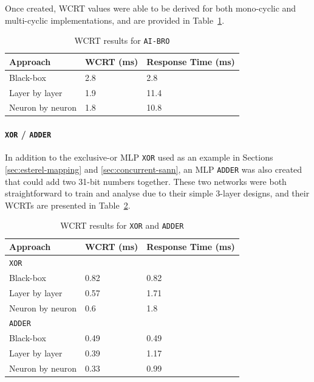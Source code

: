 

Once created, \ac{WCRT} values were able to be derived for both mono-cyclic and multi-cyclic implementations, and are provided in Table~\ref{tbl:res-aibro}.

\begin{table}[H]
	\centering
	\caption{\ac{WCRT} results for \texttt{AI-BRO}}
	\label{tbl:res-aibro}
	\begin{tabular}{|l|l|l|}
		\hline
		Approach         & WCRT (ms) & Response Time (ms)\\ \hline
		Black-box        & 2.8  & 2.8  \\ 
		Layer by layer   & 1.9  & 11.4 \\ 
		Neuron by neuron & 1.8  & 10.8 \\ \hline
	\end{tabular}
\end{table}


\paragraph{\texttt{XOR} / \texttt{ADDER}}
\label{sec:xor-and-adder}

In addition to the exclusive-or \ac{MLP} \texttt{XOR} used as an example in Sections
\ref{sec:esterel-mapping} and \ref{sec:concurrent-sann},
an \ac{MLP} \texttt{ADDER} was also created that could add two 31-bit numbers together. 
These two networks were both straightforward to train and analyse 
due to their simple 3-layer designs, and their \acp{WCRT} are presented in Table~\ref{tbl:res-xor-adder}.

\begin{table}[H]
	\centering
	\caption{\ac{WCRT} results for \texttt{XOR} and \texttt{ADDER}}
	\label{tbl:res-xor-adder}
	\begin{tabular}{|l|l|l|}
		\hline
		Approach         & WCRT (ms) & Response Time (ms)\\ \hline
		\multicolumn{3}{|l|}{\texttt{XOR}}  \\ \hline
		Black-box        & 0.82 & 0.82   \\ 
		Layer by layer   & 0.57 & 1.71  \\ 
		Neuron by neuron & 0.6  & 1.8 \\  \hline
		\multicolumn{3}{|l|}{\texttt{ADDER}}  \\ \hline
		Black-box        & 0.49 & 0.49   \\ 
		Layer by layer   & 0.39 & 1.17  \\ 
		Neuron by neuron & 0.33 & 0.99 \\  \hline
	\end{tabular}
\end{table}

